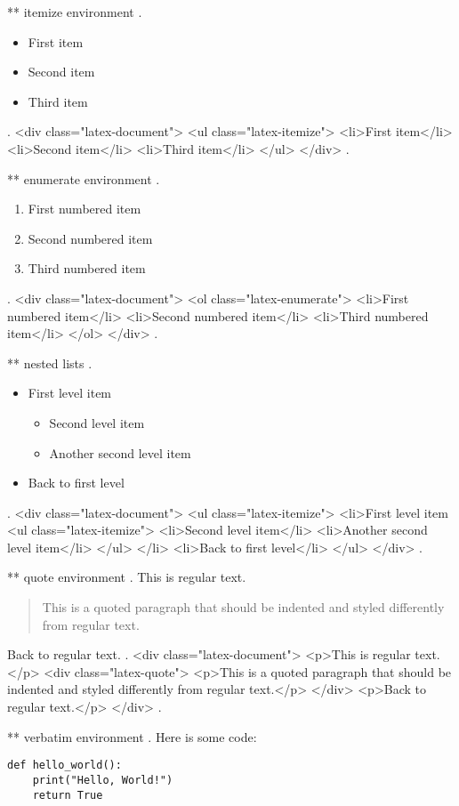 ** itemize environment
.
\begin{itemize}
\item First item
\item Second item
\item Third item
\end{itemize}
.
<div class="latex-document">
<ul class="latex-itemize">
<li>First item</li>
<li>Second item</li>
<li>Third item</li>
</ul>
</div>
.


** enumerate environment
.
\begin{enumerate}
\item First numbered item
\item Second numbered item
\item Third numbered item
\end{enumerate}
.
<div class="latex-document">
<ol class="latex-enumerate">
<li>First numbered item</li>
<li>Second numbered item</li>
<li>Third numbered item</li>
</ol>
</div>
.


** nested lists
.
\begin{itemize}
\item First level item
\begin{itemize}
\item Second level item
\item Another second level item
\end{itemize}
\item Back to first level
\end{itemize}
.
<div class="latex-document">
<ul class="latex-itemize">
<li>First level item
<ul class="latex-itemize">
<li>Second level item</li>
<li>Another second level item</li>
</ul>
</li>
<li>Back to first level</li>
</ul>
</div>
.


** quote environment
.
This is regular text.

\begin{quote}
This is a quoted paragraph that should be indented and styled differently from regular text.
\end{quote}

Back to regular text.
.
<div class="latex-document">
<p>This is regular text.</p>
<div class="latex-quote">
<p>This is a quoted paragraph that should be indented and styled differently from regular text.</p>
</div>
<p>Back to regular text.</p>
</div>
.


** verbatim environment
.
Here is some code:

\begin{verbatim}
def hello_world():
    print("Hello, World!")
    return True
\end{verbatim}

